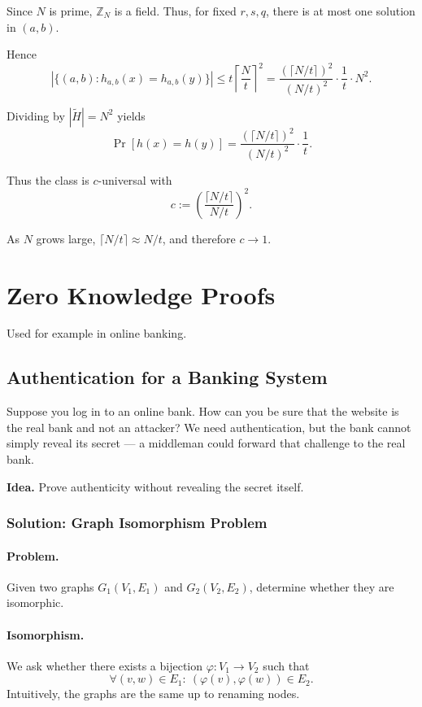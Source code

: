 \documentclass{article}
\begin{document}
Since \(N\) is prime, \(\mathbb{Z}_N\) is a field.  
Thus, for fixed \(r, s, q\), there is at most one solution in \((a,b)\).  

Hence
\[
|\{ (a,b) : h_{a,b}(x) = h_{a,b}(y) \}|
   \le t \left\lceil \frac{N}{t} \right\rceil^2
   = \frac{(\lceil N/t \rceil)^2}{(N/t)^2} \cdot \frac{1}{t} \cdot N^2.
\]

Dividing by \(|\tilde{H}| = N^2\) yields
\[
\Pr[h(x) = h(y)]
   = \frac{(\lceil N/t \rceil)^2}{(N/t)^2} \cdot \frac{1}{t}.
\]

Thus the class is \(c\)-universal with
\[
c := \left( \frac{\lceil N/t \rceil}{N/t} \right)^2.
\]

As \(N\) grows large, \(\lceil N/t \rceil \approx N/t\), and therefore \(c \to 1\).

\section{Zero Knowledge Proofs}
Used for example in online banking.

\subsection{Authentication for a Banking System}

Suppose you log in to an online bank.  
How can you be sure that the website is the real bank and not an attacker?  
We need authentication, but the bank cannot simply reveal its secret — a middleman could forward that challenge to the real bank.

\textbf{Idea.}
Prove authenticity without revealing the secret itself.

\subsubsection{Solution: Graph Isomorphism Problem}

\paragraph{Problem.}
Given two graphs \(G_1(V_1,E_1)\) and \(G_2(V_2,E_2)\), determine whether they are isomorphic.

\paragraph{Isomorphism.}
We ask whether there exists a bijection \(\varphi: V_1 \to V_2\) such that
\[
\forall (v,w) \in E_1: \ (\varphi(v),\varphi(w)) \in E_2.
\]
Intuitively, the graphs are the same up to renaming nodes.
\end{document}
